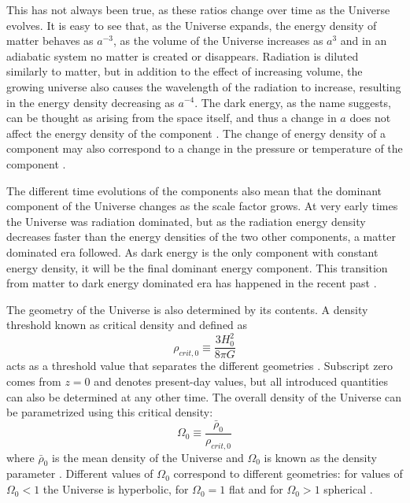 \documentclass[english, twoside]{HYgradu}
\begin{document}
This has not always been true, as these ratios change over time as the Universe evolves. It is easy to see that, as the Universe expands, the energy density of matter behaves as $a^{-3}$, as the volume of the Universe increases as $a^3$ and in an adiabatic system no matter is created or disappears. Radiation is diluted similarly to matter, but in addition to the effect of increasing volume, the growing universe also causes the wavelength of the radiation to increase, resulting in the energy density decreasing as $a^{-4}$. The dark energy, as the name suggests, can be thought as arising from the space itself, and thus a change in $a$ does not affect the energy density of the component \citep{mo2010galaxy}. The change of energy density of a component may also correspond to a change in the pressure or temperature of the component \citep{mo2010galaxy}.

The different time evolutions of the components also mean that the dominant component of the Universe changes as the scale factor grows. At very early times the Universe was radiation dominated, but as the radiation energy density decreases faster than the energy densities of the two other components, a matter dominated era followed. As dark energy is the only component with constant energy density, it will be the final dominant energy component. This transition from matter to dark energy dominated era has happened in the recent past \citep{mo2010galaxy}.

The geometry of the Universe is also determined by its contents. A density threshold known as critical density and defined as
\begin{equation}
\rho_{crit,0} \equiv \frac{3H_0^2}{8\pi G}
\end{equation}
acts as a threshold value that separates the different geometries \citep{mo2010galaxy}. Subscript zero comes from $z=0$ and denotes present-day values, but all introduced quantities can also be determined at any other time. The overall density of the Universe can be parametrized using this critical density:
\begin{equation} \label{Omega}
\Omega_0 \equiv \frac{\bar \rho_0}{\rho_{crit,0}}
\end{equation}
where $\bar\rho_0$ is the mean density of the Universe and $\Omega_0$ is known as the density parameter \citep{mo2010galaxy}. Different values of $\Omega_0$ correspond to different geometries: for values of $\Omega_0 < 1$ the Universe is hyperbolic, for $\Omega_0 = 1$ flat and for  $\Omega_0 > 1$ spherical \citep{mo2010galaxy}.
\end{document}
